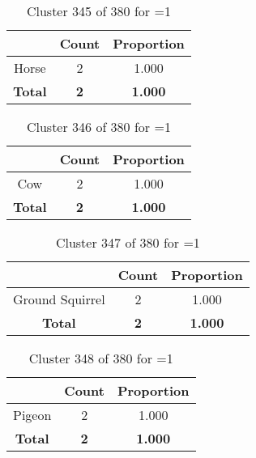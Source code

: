 \begin{table}[ht!]
\centering
\begin{tabular}{|c|c|c|}
\hline
\bf \Spec{} &\bf Count &\bf Proportion\\ \hline \hline
Horse & 2 & 1.000\\ \hline
\hline
\bf Total & \bf 2 & \bf 1.000\\ \hline
\end{tabular}
\label{tab:cluster:345:1}
\caption{Cluster 345 of 380 for \minneigh{}=1}
\end{table}

\begin{table}[ht!]
\centering
\begin{tabular}{|c|c|c|}
\hline
\bf \Spec{} &\bf Count &\bf Proportion\\ \hline \hline
Cow & 2 & 1.000\\ \hline
\hline
\bf Total & \bf 2 & \bf 1.000\\ \hline
\end{tabular}
\label{tab:cluster:346:1}
\caption{Cluster 346 of 380 for \minneigh{}=1}
\end{table}

\begin{table}[ht!]
\centering
\begin{tabular}{|c|c|c|}
\hline
\bf \Spec{} &\bf Count &\bf Proportion\\ \hline \hline
Ground Squirrel & 2 & 1.000\\ \hline
\hline
\bf Total & \bf 2 & \bf 1.000\\ \hline
\end{tabular}
\label{tab:cluster:347:1}
\caption{Cluster 347 of 380 for \minneigh{}=1}
\end{table}

\begin{table}[ht!]
\centering
\begin{tabular}{|c|c|c|}
\hline
\bf \Spec{} &\bf Count &\bf Proportion\\ \hline \hline
Pigeon & 2 & 1.000\\ \hline
\hline
\bf Total & \bf 2 & \bf 1.000\\ \hline
\end{tabular}
\label{tab:cluster:348:1}
\caption{Cluster 348 of 380 for \minneigh{}=1}
\end{table}

